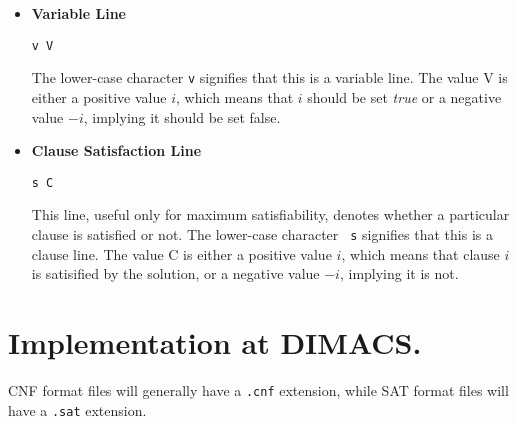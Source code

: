 \begin{itemize}
\item{\bf Variable Line}
\begin{verbatim}
v V
\end{verbatim}

The lower-case character {\tt v} signifies that this is a variable
line.  The value V is either a positive value $i$, which means that
$i$ should be set {\it true} or a negative value $-i$, implying it
should be set false.

\item{\bf Clause Satisfaction Line}
\begin{verbatim}
s C
\end{verbatim}

This line, useful only for maximum satisfiability, denotes whether a
particular clause is satisfied or not.  The lower-case character {\tt
  s} signifies that this is a clause line.  The value C is either a
positive value $i$, which means that clause $i$ is satisified by the
solution, or a negative value $-i$, implying it is not.

\end{itemize}

\section{Implementation at DIMACS.}  CNF format
files will generally have a {\tt .cnf} extension, while SAT format
files will have a {\tt .sat} extension.









